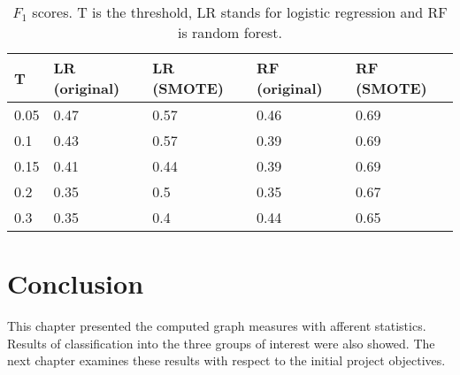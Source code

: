 		\begin{table}
		\centering
		    \begin{tabular}{|l|l|l|l|l|} \hline
		    T & LR (original) & LR (SMOTE) & RF (original) & RF (SMOTE) \\ \hline
		    0.05      & 0.47               & 0.57                 & 0.46                & 0.69                  \\
		    0.1       & 0.43               & 0.57                 & 0.39                & 0.69                  \\
		    0.15      & 0.41               & 0.44                 & 0.39                & 0.69                  \\
		    0.2       & 0.35               & 0.5                  & 0.35                & 0.67                  \\
		    0.3       & 0.35               & 0.4                  & 0.44                & 0.65                  \\
		    \hline
		    \end{tabular}
		    \caption{\(F_1\) scores. T is the threshold, LR stands for logistic regression and RF is random forest.}
		    \label{tab:fscores}
		\end{table}





\section*{Conclusion}
	This chapter presented the computed graph measures with afferent statistics. Results of classification into the three groups of interest were also showed. The next chapter examines these results with respect to the initial project objectives. 
